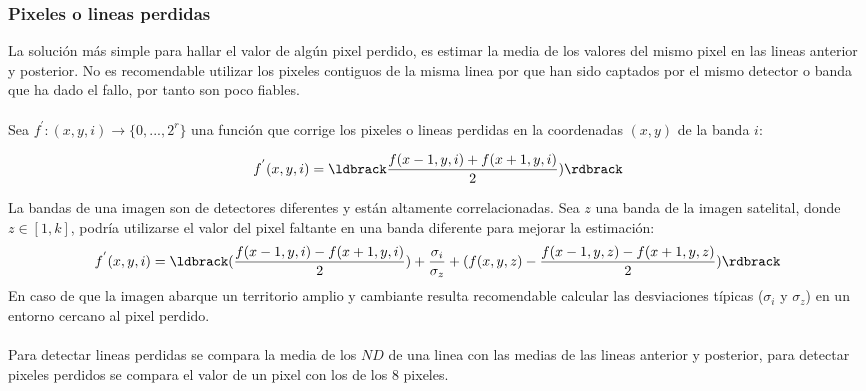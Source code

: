 \subsubsection{Pixeles o lineas perdidas}\label{subsec:pixelesP}
La soluci\'on m\'as simple para hallar el valor de alg\'un pixel perdido, es estimar la media de los valores
del mismo pixel en las lineas anterior y posterior. No es recomendable utilizar los pixeles contiguos de la misma linea por que han sido captados por el mismo detector o banda que ha dado el fallo, por tanto son poco fiables.\\~\\
Sea $ f^{'}:(x,y,i)\longrightarrow \{0,...,2^{r}\} $ una funci\'on que corrige los pixeles o lineas perdidas en la coordenadas $ (x,y) $ de la banda $ i $:

		\begin{equation}
		f^{'}(x,y,i) = \ldbrack \dfrac{f(x-1,y,i) + f(x+1,y,i)}{2}) \rdbrack
		\end{equation} 

La bandas de una imagen son de detectores diferentes y est\'an altamente correlacionadas. Sea  $ z $ una banda de la imagen satelital, donde $ z \in [1,k] $, podr\'ia utilizarse el valor del pixel faltante en una banda diferente para mejorar la estimaci\'on:
		\begin{equation}
		f^{'}(x,y,i) = \ldbrack (\dfrac{f(x-1,y,i)-f(x+1,y,i)}{2})+ \dfrac{\sigma_{i}}{\sigma_{z}} +(f(x,y,z)-\dfrac{f(x-1,y,z)-f(x+1,y,z)}{2}) \rdbrack
		\end{equation} 
En caso de que la imagen abarque un territorio amplio y cambiante resulta recomendable calcular las desviaciones t\'ipicas ($ \sigma_{i} $ y $ \sigma_{z} $) en un entorno cercano al pixel perdido.\\~\\
Para detectar lineas perdidas se compara la media de los $ ND $ de una linea con las medias de las lineas anterior y posterior, para detectar pixeles perdidos se compara el valor de un pixel con los de los 8 pixeles.
